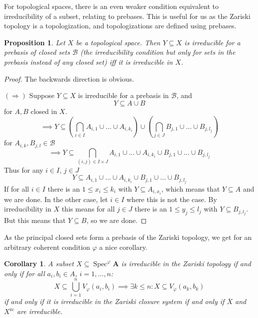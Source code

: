 \documentclass{article}
\theoremstyle{plain}
\newtheorem{corollary}[theorem]{Corollary}
\newtheorem{proposition}[theorem]{Proposition}
\theoremstyle{definition}
\newcommand{\Spec}{\operatorname{Spec}}
\begin{document}
For topological spaces, there is an even weaker condition equivalent to irreducibility of a subset, relating to prebases.
This is useful for us as the Zariski topology is a topologization, and topologizations are defined using prebases.

\begin{proposition} \label{lem:topspaceirr}
    Let $X$ be a topological space.
    Then $Y \subseteq X$ is irreducible for a prebasis of closed sets $\mathcal{B}$ (the irreducibility condition but only for sets in the prebasis instead of any closed set) iff it is irreducible in $X$.
\end{proposition}
\begin{proof}
    The backwards direction is obvious.\par
    $(\Rightarrow)$
    Suppose $Y \subseteq X$ is irreducible for a prebasis in $\mathcal{B}$, and
    $$Y \subseteq A \cup B$$
    for $A, B$ closed in $X$.
    $$\implies Y \subseteq (\bigcap_{i \in I} A_{i, 1} \cup \dots \cup A_{i, k_i}) \cup (\bigcap_{j \in J} B_{j, 1} \cup \dots \cup B_{j, l_j})$$
    for $A_{i, k}, B_{j, l}\in \mathcal{B}$
    $$\implies Y \subseteq \bigcap_{(i, j) \in I\times J} A_{i, 1} \cup \dots \cup A_{i, k_i} \cup B_{j, 1} \cup \dots \cup B_{j, l_j}$$
    Thus for any $i \in I$, $j \in J$
    $$Y \subseteq A_{i, 1} \cup \dots \cup A_{i, k_i} \cup B_{j, 1} \cup \dots \cup B_{j, l_j}$$
    If for all $i \in I$ there is an $1\leq x_i \leq k_i$ with $Y \subseteq A_{i, x_i}$, which means that $Y \subseteq A$ and we are done.
    In the other case, let $i \in I$ where this is not the case.
    By irreducibility in $X$ this means for all $j \in J$ there is an $1\leq y_j \leq l_j$ with $Y \subseteq B_{j, l_j}$.
    But this means that $Y \subseteq B$, so we are done.
\end{proof}

As the principal closed sets form a prebasis of the Zariski topology, we get for an arbitrary coherent condition $\varphi$ a nice corollary.

\begin{corollary} \label{col:irrsetzar}
    A subset $X \subseteq \Spec^\varphi\mathbf{A}$ is irreducible in the Zariski topology if and only if for all $a_i, b_i \in A$, $i = 1, \dots, n$:
    $$X \subseteq \bigcup_{i=1}^nV_\varphi(a_i, b_i) \implies \exists k \leq n : X \subseteq V_\varphi(a_k, b_k)$$
    if and only if it is irreducible in the Zariski closure system if and only if $\overline{X}$ and $X^{\operatorname{zc}}$ are irreducible.
\end{corollary}
\end{document}
